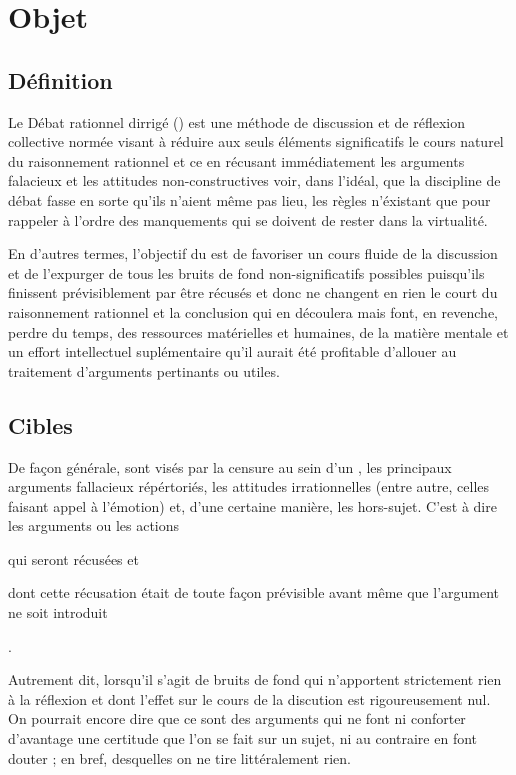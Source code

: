 \section{Objet}

\subsection{Définition}
Le Débat rationnel dirrigé (\mainabbr{}) est une méthode de discussion et de réflexion collective normée visant à réduire aux seuls éléments significatifs le cours naturel du raisonnement rationnel et ce en récusant immédiatement les arguments falacieux et les attitudes non-constructives voir, dans l’idéal, que la discipline de débat fasse en sorte qu’ils n’aient même pas lieu, les règles n’éxistant que pour rappeler à l’ordre des manquements qui se doivent de rester dans la virtualité.

En d’autres termes, l’objectif du \mainabbr{} est de favoriser un cours fluide de la discussion et de l’expurger de tous les bruits de fond non-significatifs possibles puisqu’ils finissent prévisiblement par être récusés et donc ne changent en rien le court du raisonnement rationnel et la conclusion qui en découlera mais font, en revenche, perdre du temps, des ressources matérielles et humaines, de la matière mentale et un effort intellectuel suplémentaire qu’il aurait été profitable d’allouer au traitement d’arguments pertinants ou utiles.

\subsection{Cibles}
De façon générale, sont visés par la censure au sein d’un \mainabbr{}, les principaux arguments fallacieux répértoriés, les attitudes irrationnelles (entre autre, celles faisant appel à l’émotion) et, d’une certaine manière, les hors-sujet. C’est à dire les arguments ou les actions
\begin{SRlist}
	\item qui seront récusées
	et
	\item dont cette récusation était de toute façon prévisible avant même que l’argument ne soit introduit%
\end{SRlist}%
.

Autrement dit, lorsqu’il s’agit de bruits de fond qui n’apportent strictement rien à la réflexion et dont l’effet sur le cours de la discution est rigoureusement nul. On pourrait encore dire que ce sont des arguments qui ne font ni conforter d’avantage une certitude que l’on se fait sur un sujet, ni au contraire en font douter ; en bref, desquelles on ne tire littéralement rien.

